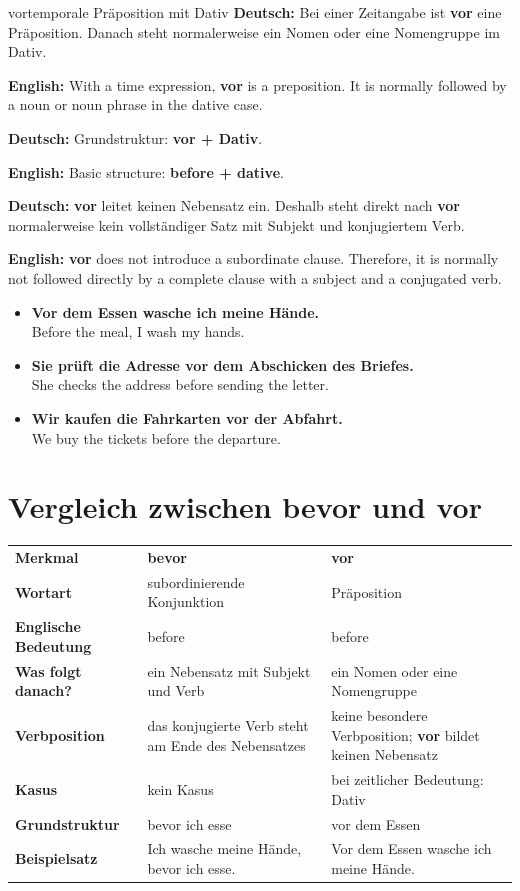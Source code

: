 \documentclass[a4paper,11pt]{article}
\newcommand{\GermanText}[1]{\textbf{Deutsch: }#1\par}
\newcommand{\EnglishText}[1]{{\small\color{SoftGray}\textbf{English: }#1\par}}
\newcommand{\ExampleItem}[2]{\item \textbf{#1}\\{\small\color{SoftGray}#2}}
\begin{document}
        \begin{grammarentry}{vor}{temporale Präposition mit Dativ}
            \GermanText{Bei einer Zeitangabe ist \textbf{vor} eine Präposition. Danach steht normalerweise ein Nomen oder eine Nomengruppe im Dativ.}
            \EnglishText{With a time expression, \textbf{vor} is a preposition. It is normally followed by a noun or noun phrase in the dative case.}

            \GermanText{Grundstruktur: \textbf{vor + Dativ}.}
            \EnglishText{Basic structure: \textbf{before + dative}.}

            \GermanText{\textbf{vor} leitet keinen Nebensatz ein. Deshalb steht direkt nach \textbf{vor} normalerweise kein vollständiger Satz mit Subjekt und konjugiertem Verb.}
            \EnglishText{\textbf{vor} does not introduce a subordinate clause. Therefore, it is normally not followed directly by a complete clause with a subject and a conjugated verb.}
        \end{grammarentry}

        \begin{exbox}
            \begin{itemize}
                \ExampleItem{Vor dem Essen wasche ich meine Hände.}{Before the meal, I wash my hands.}
                \ExampleItem{Sie prüft die Adresse vor dem Abschicken des Briefes.}{She checks the address before sending the letter.}
                \ExampleItem{Wir kaufen die Fahrkarten vor der Abfahrt.}{We buy the tickets before the departure.}
            \end{itemize}
        \end{exbox}

    \section{Vergleich zwischen \glqq bevor\grqq{} und \glqq vor\grqq}

        \begin{longtable}{>{\bfseries}p{3.1cm}|p{5.2cm}|p{5.2cm}}
            \rowcolor{HeaderBlueDark}
            \color{white}\textbf{Merkmal} &
            \color{white}\textbf{bevor} &
            \color{white}\textbf{vor} \\
            Wortart & subordinierende Konjunktion & Präposition \\
            Englische Bedeutung & before & before \\
            Was folgt danach? & ein Nebensatz mit Subjekt und Verb & ein Nomen oder eine Nomengruppe \\
            Verbposition & das konjugierte Verb steht am Ende des Nebensatzes & keine besondere Verbposition; \textbf{vor} bildet keinen Nebensatz \\
            Kasus & kein Kasus & bei zeitlicher Bedeutung: Dativ \\
            Grundstruktur & bevor ich esse & vor dem Essen \\
            Beispielsatz & Ich wasche meine Hände, bevor ich esse. & Vor dem Essen wasche ich meine Hände. \\
        \end{longtable}
\end{document}
